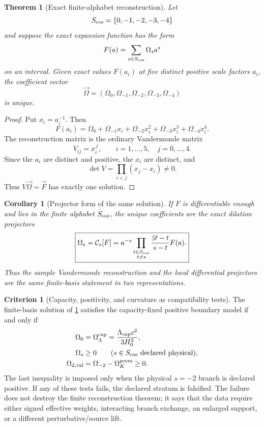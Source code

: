 \documentclass[aps,prd,reprint,nofootinbib,superscriptaddress,floatfix]{revtex4-2}
\numberwithin{equation}{section}
\theoremstyle{definition}
\newtheorem{criterion}{Criterion}[section]
\theoremstyle{plain}
\newtheorem{theorem}{Theorem}[section]
\newtheorem{corollary}{Corollary}[section]
\newcommand{\Dil}{\mathscr D}
\begin{document}
\begin{theorem}[Exact finite-alphabet reconstruction]\label{thm:finite-reconstruction}
Let
\[
S_{\rm cos}=\{0,-1,-2,-3,-4\}
\]
and suppose the exact expansion function has the form
\[
F(a)=\sum_{s\in S_{\rm cos}}\Omega_s a^s
\]
on an interval.  Given exact values \(F(a_i)\) at five distinct positive
scale factors \(a_i\), the coefficient vector
\[
\vec\Omega=(\Omega_0,\Omega_{-1},\Omega_{-2},\Omega_{-3},\Omega_{-4})
\]
is unique.
\end{theorem}

\begin{proof}
Put \(x_i=a_i^{-1}\).  Then
\[
F(a_i)=\Omega_0+\Omega_{-1}x_i+\Omega_{-2}x_i^2
+\Omega_{-3}x_i^3+\Omega_{-4}x_i^4.
\]
The reconstruction matrix is the ordinary Vandermonde matrix
\[
V_{ij}=x_i^{\,j},\qquad i=1,\ldots,5,\quad j=0,\ldots,4.
\]
Since the \(a_i\) are distinct and positive, the \(x_i\) are distinct, and
\[
\det V=\prod_{i<j}(x_j-x_i)\ne0.
\]
Thus \(V\vec\Omega=\vec F\) has exactly one solution.
\end{proof}

\begin{corollary}[Projector form of the same solution]\label{cor:projector-unique}
If \(F\) is differentiable enough and lies in the finite alphabet
\(S_{\rm cos}\), the unique coefficients are the exact dilation projectors
\begin{equation}
\boxed{
\Omega_s=\mathcal C_s[F]
=
a^{-s}
\prod_{\substack{t\in S_{\rm cos}\\t\ne s}}
\frac{\Dil-t}{s-t}F(a).
}
\end{equation}
Thus the sample Vandermonde reconstruction and the local differential
projectors are the same finite-basis statement in two representations.
\end{corollary}

\begin{criterion}[Capacity, positivity, and curvature as compatibility tests]
The finite-basis solution of \cref{thm:finite-reconstruction} satisfies the
capacity-fixed positive boundary model if and only if
\begin{align}
\Omega_0&=\Omega_\Lambda^{\rm cap}
=\frac{\Lambda_{\rm cap}c^2}{3H_0^2},\\
\Omega_s&\ge0
\qquad (s\in S_{\rm cos}\ {\rm declared\ physical}),\\
\Omega_{2,\rm val}
&=\Omega_{-2}-\Omega_K^{\rm geom}\ge0 .
\end{align}
The last inequality is imposed only when the physical \(s=-2\) branch is
declared positive.
If any of these tests fails, the declared stratum is falsified.  The failure
does not destroy the finite reconstruction theorem; it says that the data
require either signed effective weights, interacting branch exchange, an
enlarged support, or a different perturbative/source lift.
\end{criterion}
\end{document}
